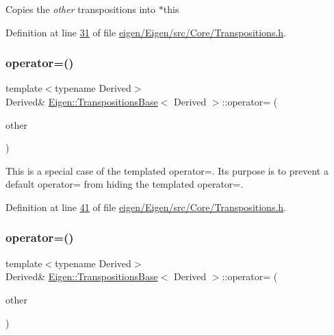 Copies the {\itshape other} transpositions into {\ttfamily $\ast$this} 

Definition at line \hyperlink{eigen_2_eigen_2src_2_core_2_transpositions_8h_source_l00031}{31} of file \hyperlink{eigen_2_eigen_2src_2_core_2_transpositions_8h_source}{eigen/\+Eigen/src/\+Core/\+Transpositions.\+h}.

\mbox{\label{class_eigen_1_1_transpositions_base_a8d12862df7ffdb0f2cfd81ab122847ca}} 
\subsubsection{\texorpdfstring{operator=()}{operator=()}\hspace{0.1cm}{\footnotesize\ttfamily [3/4]}}
{\footnotesize\ttfamily template$<$typename Derived$>$ \\
Derived\& \hyperlink{class_eigen_1_1_transpositions_base}{Eigen\+::\+Transpositions\+Base}$<$ Derived $>$\+::operator= (\begin{DoxyParamCaption}\item[{const \hyperlink{class_eigen_1_1_transpositions_base}{Transpositions\+Base}$<$ Derived $>$ \&}]{other }\end{DoxyParamCaption})\hspace{0.3cm}{\ttfamily [inline]}}

This is a special case of the templated operator=. Its purpose is to prevent a default operator= from hiding the templated operator=. 

Definition at line \hyperlink{eigen_2_eigen_2src_2_core_2_transpositions_8h_source_l00041}{41} of file \hyperlink{eigen_2_eigen_2src_2_core_2_transpositions_8h_source}{eigen/\+Eigen/src/\+Core/\+Transpositions.\+h}.

\mbox{\label{class_eigen_1_1_transpositions_base_a8d12862df7ffdb0f2cfd81ab122847ca}} 
\subsubsection{\texorpdfstring{operator=()}{operator=()}\hspace{0.1cm}{\footnotesize\ttfamily [4/4]}}
{\footnotesize\ttfamily template$<$typename Derived$>$ \\
Derived\& \hyperlink{class_eigen_1_1_transpositions_base}{Eigen\+::\+Transpositions\+Base}$<$ Derived $>$\+::operator= (\begin{DoxyParamCaption}\item[{const \hyperlink{class_eigen_1_1_transpositions_base}{Transpositions\+Base}$<$ Derived $>$ \&}]{other }\end{DoxyParamCaption})\hspace{0.3cm}{\ttfamily [inline]}}

